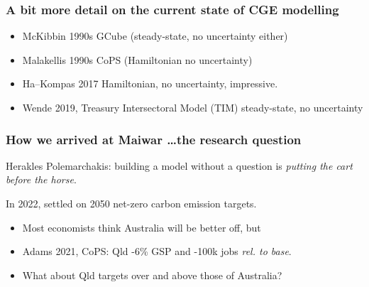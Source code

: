 \documentclass[handout,english]{beamer}
\begin{document}
\begin{frame}
  \frametitle{A bit more detail on the current state of CGE modelling}
  \begin{itemize}
      \item McKibbin 1990s GCube (steady-state, no uncertainty either)
      \item Malakellis 1990s CoPS (Hamiltonian no uncertainty)
      \item Ha--Kompas 2017 Hamiltonian, no uncertainty, impressive.
      \item Wende 2019, Treasury Intersectoral Model (TIM) steady-state,
        no uncertainty
  \end{itemize}
\end{frame}
\begin{frame}
  \frametitle{How we arrived at Maiwar \dots the research question}
  Herakles Polemarchakis: building a model without a question is 
  \emph{putting the cart before the horse}.

  In 2022, settled on 2050 net-zero carbon emission targets.
    \begin{itemize}
      \item Most economists think Australia will be better off, but
      \item Adams 2021, CoPS: Qld -6\% GSP and -100k jobs \emph{rel. to base}.
      \item What about Qld targets over and above those of Australia?
    \end{itemize}
\end{frame}
\end{document}
